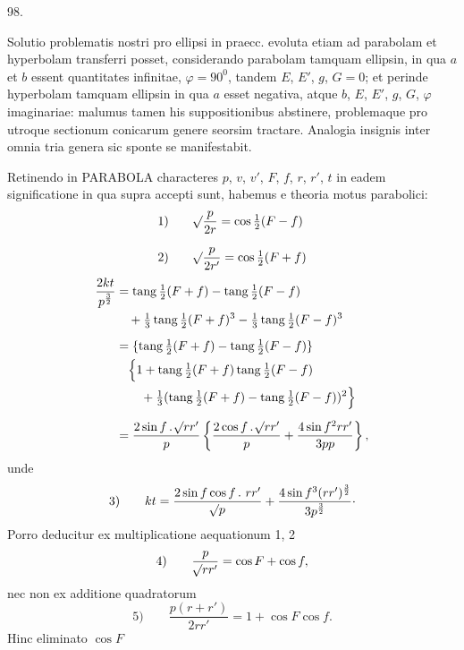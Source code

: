 \par{}\medskip
{}
\begin{center}98.\end{center}
Solutio problematis nostri pro ellipsi in praecc. evoluta etiam ad parabolam et hyperbolam transferri posset, considerando parabolam tamquam ellipsin, in qua $a$ et $b$ essent quantitates infinitae, $\varphi=90^0$, tandem $E$, $E'$, $g$, $G=0$; et perinde hyperbolam tamquam ellipsin in qua $a$ esset negativa, atque $b$, $E$, $E'$, $g$, $G$, $\varphi$ imaginariae: malumus tamen his suppositionibus abstinere, problemaque pro utroque sectionum conicarum genere seorsim tractare. Analogia insignis inter omnia tria genera sic sponte se manifestabit.

Retinendo in PARABOLA characteres $p$, $v$, $v'$, $F$, $f$, $r$, $r'$, $t$ in eadem significatione in qua supra accepti sunt, habemus e theoria motus parabolici:
\[
\begin{aligned}
\mathrm{1)}\qquad&\mathord{{}^{}\!\surd}\dfrac p{2r}=\cos\tfrac12(F-f)\\[.7em]
\mathrm{2)}\qquad&\mathord{{}^{}\!\surd}\dfrac p{2r'}=\cos\tfrac12(F+f)
\end{aligned}
\]
\[
\begin{aligned}
\frac{2kt}{p^{\frac32}}&=\operatorname{tang}\tfrac12(F+f)-\operatorname{tang}\tfrac12(F-f)\\
&\quad+\tfrac13\operatorname{tang}\tfrac12(F+f)^3-\tfrac13\operatorname{tang}\tfrac12(F-f)^3\\[.5em]
&=\{\operatorname{tang}\tfrac12(F+f)-\operatorname{tang}\tfrac12(F-f)\}\\
&\quad\Bigl\{1+\operatorname{tang}\tfrac12(F+f)\operatorname{tang}\tfrac12(F-f)\\
&\qquad+\tfrac13(\operatorname{tang}\tfrac12(F+f)-\operatorname{tang}\tfrac12(F-f))^2\Bigr\}\\[.5em]
&=\frac{2\sin f\,\mathpunct{.}\mathord{{}^{}\!\surd}rr'}p
\left\{\frac{2\cos f\,\mathpunct{.}\mathord{{}^{}\!\surd}rr'}p+\frac{4\sin f^2rr'}{3pp}\right\},
\end{aligned}
\]
\noindent unde
\[
\mathrm{3)}\qquad kt=\frac{2\sin f\cos f\,\mathpunct{.}\,rr'}{\mathord{{}^{}\!\surd}p}+\frac{4\sin f^3(rr')^{\frac32}}{3p^{\frac32}}\mathpunct{\cdot}
\]
\noindent Porro deducitur ex multiplicatione aequationum 1, 2
\[
\mathrm{4)}\qquad \frac p{\mathord{{}^{}\!\surd}rr'}=\cos F+\cos f,
\]
\noindent nec non ex additione quadratorum
\[
\mathrm{5)}\qquad \frac{p(r+r')}{2rr'}=1+\cos F\cos f.
\]
\noindent Hinc eliminato $\cos F$
